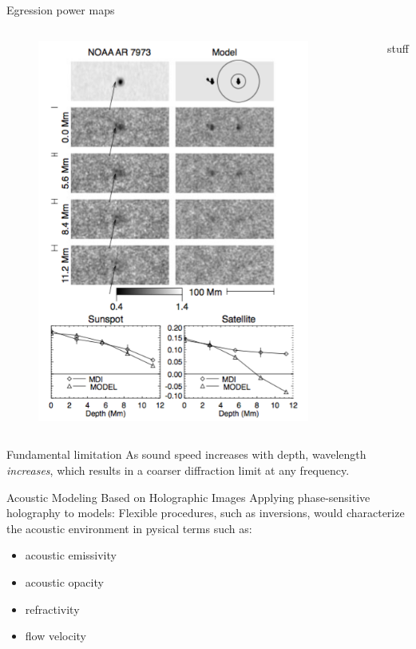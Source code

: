 \documentclass{beamer}
\begin{document}
\begin{frame}{Egression power maps}
    \begin{columns}
        \begin{figure}
            \vspace{-0.25cm}
            \includegraphics[width=0.9\textwidth]{fig_5.png}
        \end{figure}
        stuff
    \end{columns}
\end{frame}

\begin{frame}{Fundamental limitation}
    As sound speed increases with depth, wavelength
    \emph{increases}, which results in a coarser diffraction limit at
    any frequency.
\end{frame}
\begin{frame}{Acoustic Modeling Based on Holographic Images}
    Applying phase-sensitive holography to models:
    Flexible procedures, such as inversions, would characterize the
    acoustic environment in pysical terms such as:
    \begin{itemize}
        \item acoustic emissivity
        \item acoustic opacity
        \item refractivity
        \item flow velocity
    \end{itemize}
\end{frame}
\end{document}
